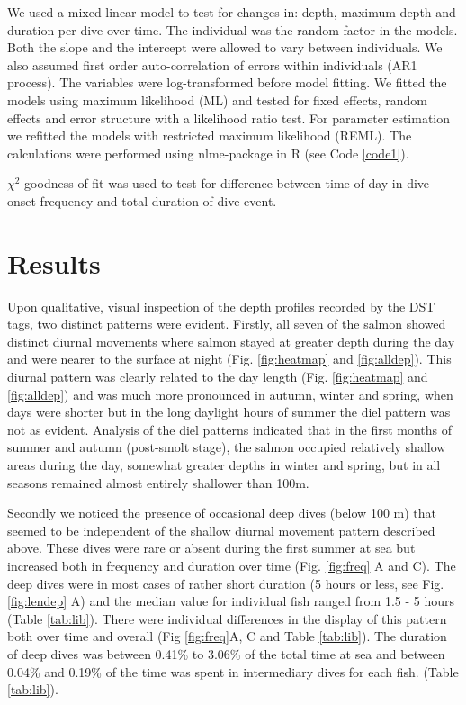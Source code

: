 We used a mixed linear model to test for changes in: depth, maximum depth and duration per dive over time. 
The individual was the random factor in the models. Both the slope and the intercept were allowed to vary between individuals. We also assumed first order auto-correlation of errors within individuals (AR1 process). The variables were log-transformed before model fitting. We fitted the models using maximum likelihood (ML) and tested for fixed effects, random effects and error structure with a likelihood ratio test. For parameter estimation we refitted the models with restricted maximum likelihood (REML). The calculations were performed using nlme-package \citep{Pinheiro2009} in R (see Code \ref{code1}).

$\chi^2$-goodness of fit was used to test for difference between time of day in dive onset frequency and total duration of dive event. 

\section{Results}
\label{Res}
Upon qualitative, visual inspection of the depth profiles recorded by the DST tags, two distinct patterns were evident. 
Firstly, all seven of the salmon showed distinct diurnal movements where salmon stayed at greater depth during the day and were nearer to the surface at night (Fig. \ref{fig:heatmap} and \ref{fig:alldep}). 
This diurnal pattern was clearly related to the day length (Fig. \ref{fig:heatmap} and \ref{fig:alldep}) and was much more pronounced in autumn, winter and spring, when days were shorter but in the long daylight hours of summer the diel pattern was not as evident. Analysis of the diel patterns indicated that in the first months of summer and autumn (post-smolt stage), the salmon occupied relatively shallow areas during the day, somewhat greater depths in winter and spring, but in all seasons remained almost entirely shallower than 100m.

Secondly we noticed the presence of occasional deep dives (below 100 m) that seemed to be independent of the shallow diurnal movement pattern described above. These dives were rare or absent during the first summer at sea but increased both in frequency and duration over time (Fig. \ref{fig:freq} A and C). 
The deep dives were in most cases of rather short duration (5 hours or less, see Fig. \ref{fig:lendep} A) and the median value for individual fish ranged from 1.5 - 5 hours (Table \ref{tab:lib}). 
There were individual differences in the display of this pattern both over time and overall (Fig \ref{fig:freq}A, C and Table \ref{tab:lib}). 
The duration of deep dives was between 0.41\% to 3.06\% of the total time at sea and between 0.04\% and 0.19\% of the time was spent in intermediary dives for each fish. (Table \ref{tab:lib}).

